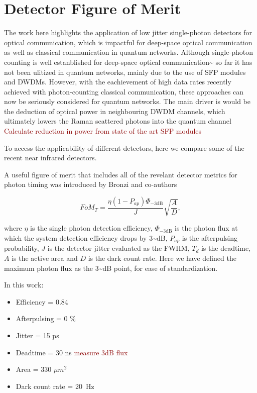 \documentclass[11pt]{caltech_thesis} %
\begin{document}
\hypertarget{detector-figure-of-merit}{%
\chapter{Detector Figure of Merit}\label{detector-figure-of-merit}}

The work here highlights the application of low jitter single-photon
detectors for optical communication, which is impactful for deep-space
optical communication as well as classical communication in quantum
networks. Although single-photon counting is well estanblished for
deep-space optical
communication\textasciitilde{}\autocite{Laser,lunar,DSOC} so far it has
not been ulitized in quantum networks, mainly due to the use of SFP
modules and DWDMs. However, with the eachievement of high data rates
recently achieved with photon-counting classical communication, these
approaches can now be seriously considered for quantum networks. The
main driver is would be the deduction of optical power in neighbouring
DWDM channels, which ultimately lowers the Raman scattered photons into
the quantum channel \autocite{EraerdsRaman}
\textcolor{darkred}{Calculate reduction in power from state of the art
SFP modules}

To access the applicability of different detectors, here we compare some
of the recent near infrared detectors.

A useful figure of merit that includes all of the revelant detector
metrics for photon timing was introduced by Bronzi and co-authors
\autocite{Bronzi2016}

\[FoM_T = \frac{\eta  (1 - P_{ap})\Phi_{-3 \text{dB}}}{J} \sqrt{\frac{A}{D}},\]

where \(\eta\) is the single photon detection efficiency,
\(\Phi_{-3 \text{dB}}\) is the photon flux at which the system detection
efficiency drops by 3\textasciitilde dB, \(P_{ap}\) is the afterpulsing
probability, \(J\) is the detector jitter evaluated as the FWHM, \(T_d\)
is the deadtime, \(A\) is the active area and \(D\) is the dark count
rate. Here we have defined the maximum photon flux as the
3\textasciitilde dB point, for ease of standardization.

In this work:

\begin{itemize}
\item
  Efficiency = 0.84
\item
  Afterpulsing = 0 \%
\item
  Jitter = 15 ps
\item
  Deadtime = 30 ns \textcolor{darkred}{measure 3dB flux}
\item
  Area = 330 \(\mu m^2\)
\item
  Dark count rate = 20~Hz
\end{itemize}
\end{document}
